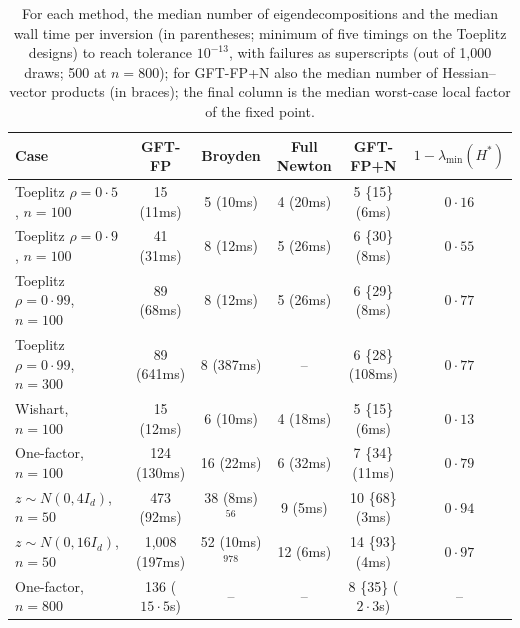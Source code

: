 \documentclass[11pt]{article}
\begin{document}
\begin{table}
\centering
\caption{For each method, the median number of eigendecompositions and
the median wall time per inversion (in parentheses; minimum of five
timings on the Toeplitz designs) to reach tolerance
$10^{-13}$, with failures as superscripts (out of 1{,}000 draws; 500 at
$n=800$); for GFT-FP+N also the median number of Hessian--vector
products (in braces); the final column is the median worst-case local
factor of the fixed point.}\label{tab:bench}
\medskip
\footnotesize
\setlength{\tabcolsep}{3pt}
\begin{tabular}{lccccc}
\toprule
Case & GFT-FP & Broyden & Full Newton & GFT-FP+N & $1-\lambda_{\min}(H^{\ast})$\\
\midrule
Toeplitz $\rho=0{\cdot}5$, $n=100$  & 15 (11ms) & 5 (10ms) & 4 (20ms) & 5 \{15\} (6ms) & $0{\cdot}16$\\
Toeplitz $\rho=0{\cdot}9$, $n=100$  & 41 (31ms) & 8 (12ms) & 5 (26ms) & 6 \{30\} (8ms) & $0{\cdot}55$\\
Toeplitz $\rho=0{\cdot}99$, $n=100$ & 89 (68ms) & 8 (12ms) & 5 (26ms) & 6 \{29\} (8ms) & $0{\cdot}77$\\
Toeplitz $\rho=0{\cdot}99$, $n=300$ & 89 (641ms) & 8 (387ms) & -- & 6 \{28\} (108ms) & $0{\cdot}77$\\
Wishart, $n=100$                    & 15 (12ms) & 6 (10ms) & 4 (18ms) & 5 \{15\} (6ms) & $0{\cdot}13$\\
One-factor, $n=100$                 & 124 (130ms) & 16 (22ms) & 6 (32ms) & 7 \{34\} (11ms) & $0{\cdot}79$\\
$z\sim N(0,4I_d)$, $n=50$           & 473 (92ms) & 38 (8ms)$^{56}$ & 9 (5ms) & 10 \{68\} (3ms) & $0{\cdot}94$\\
$z\sim N(0,16I_d)$, $n=50$          & 1{,}008 (197ms) & 52 (10ms)$^{978}$ & 12 (6ms) & 14 \{93\} (4ms) & $0{\cdot}97$\\
One-factor, $n=800$                 & 136 ($15{\cdot}5$s) & -- & -- & 8 \{35\} ($2{\cdot}3$s) & --\\
\bottomrule
\end{tabular}
\end{table}
\end{document}
